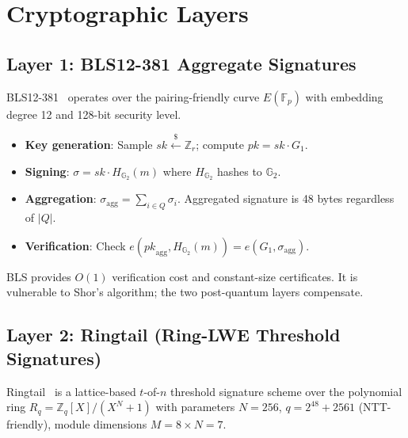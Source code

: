 \section{Cryptographic Layers}

\label{sec:crypto}

\subsection{Layer 1: BLS12-381 Aggregate Signatures}

BLS12-381~\cite{boneh2001short} operates over the pairing-friendly curve
$E(\mathbb{F}_p)$ with embedding degree 12 and 128-bit security level.

\begin{itemize}[leftmargin=2em]
\item \textbf{Key generation}: Sample $\mathit{sk} \xleftarrow{\$}
      \mathbb{Z}_r$; compute $\mathit{pk} = \mathit{sk} \cdot G_1$.
\item \textbf{Signing}: $\sigma = \mathit{sk} \cdot H_{\mathbb{G}_2}(m)$
      where $H_{\mathbb{G}_2}$ hashes to $\mathbb{G}_2$.
\item \textbf{Aggregation}: $\sigma_{\mathrm{agg}} = \sum_{i \in Q}
      \sigma_i$. Aggregated signature is 48 bytes regardless of $|Q|$.
\item \textbf{Verification}: Check $e(\mathit{pk}_{\mathrm{agg}},
      H_{\mathbb{G}_2}(m)) = e(G_1, \sigma_{\mathrm{agg}})$.
\end{itemize}

BLS provides $O(1)$ verification cost and constant-size certificates.
It is vulnerable to Shor's algorithm; the two post-quantum layers compensate.

\subsection{Layer 2: Ringtail (Ring-LWE Threshold Signatures)}

Ringtail~\cite{ringtail} is a lattice-based $t$-of-$n$ threshold signature
scheme over the polynomial ring $R_q = \mathbb{Z}_q[X]/(X^N + 1)$ with
parameters $N = 256$, $q = 2^{48} + 2561$ (NTT-friendly), module dimensions
$M = 8 \times N = 7$.

